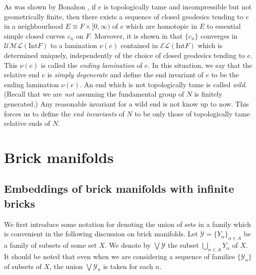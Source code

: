\documentclass{amsart}
\theoremstyle{definition}
\numberwithin{figure}{section}
\numberwithin{equation}{section}
\def\fd{\pi_1}
\def\Int{\mathrm{Int}}
\begin{document}
As was shown by Bonahon \cite{bon}, if $e$ is topologically tame and incompressible but not geometrically finite, then 
there exists a sequence of closed geodesics tending to $e$ in a neighbourhood $E \cong F \times [0,\infty)$ of $e$ which are homotopic in $E$ to essential simple closed curves $c_n$ on $F$. 
Moreover, it is shown in \cite{th1} that $\{c_n\}$ converges in $\mathcal{UML}(\Int F)$ to a lamination $\nu(e)$ contained in $\mathcal{EL}(\Int F)$ which is determined uniquely, independently of the choice of closed geodesics tending to $e$.
This $\nu(e)$ is  called the \emph{ending lamination} of $e$.
In this situation, we say that the relative end $e$ is \emph{simply degenerate} and define the end invariant of $e$ to be the ending lamination $\nu(e)$.
An end which is not topologically tame is called \emph{wild}.
(Recall that we are {\em not} assuming the fundamental group of $N$ is finitely generated.)
Any reasonable invariant for a wild end is not know up to now.
This forces us to define the \emph{end invariants} of $N$ to be only those of topologically tame relative ends of $N$.


%


\section{Brick manifolds}\label{S_2}

\subsection{Embeddings of  brick manifolds with infinite bricks}\label{SS_EIBM}
We first introduce some notation for denoting the union of sets in a family which is convenient in the following discussion on brick manifolds.
Let $\mathcal{Y}=\{Y_\alpha\}_{\alpha\in A}$ be a family of subsets of  some set $X$.
We denote by $\bigvee\mathcal{Y}$  the subset $\bigcup_{\alpha\in A}Y_\alpha$ of $X$.
It should be noted that even when we are considering a sequence of families $\{\mathcal Y_n\}$ of subsets of $X$,  the union $\bigvee \mathcal{Y}_n$ is taken for each $n$.
\end{document}
